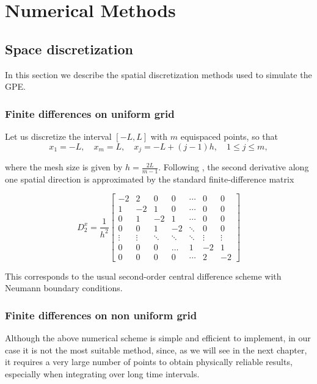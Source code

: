 \chapter{Numerical Methods}

\section{Space discretization}

In this section we describe the spatial discretization methods used to simulate the GPE.

\subsection{Finite differences on uniform grid}

Let us discretize the interval $[-L, L]$ with $m$ equispaced points, so that 
\[
    x_1 = -L, \quad x_m = L, \quad x_j = -L + (j-1)h, \quad 1 \leq j \leq m,
\]

where the mesh size is given by $h = \tfrac{2L}{m-1}$.  
Following \cite{dispenseCaliari}, the second derivative along one spatial direction is approximated by the standard finite-difference matrix

\[
    D_{2}^x = \frac{1}{h^2}
    \begin{bmatrix}
        -2 & 2  & 0  & 0  & \cdots & 0  & 0 \\
        1 & -2 & 1  & 0  & \cdots & 0  & 0 \\
        0 &  1 & -2 & 1  & \cdots & 0  & 0 \\
        0 &  0 &  1 & -2 & \ddots & 0  & 0 \\
        \vdots & \vdots & \ddots & \ddots & \ddots & \vdots & \vdots \\
        0 &  0 &  0 &  \dots & 1 & -2 & 1 \\
        0 &  0 &  0 &  0 & \cdots &  2 & -2
    \end{bmatrix}
\]

This corresponds to the usual second-order central difference scheme with Neumann boundary conditions. 

\subsection{Finite differences on non uniform grid}
\label{sb:nufg}

Although the above numerical scheme is simple and efficient to implement, in our case it is not the most suitable method, since, as we will see in the next chapter, it requires a very large number of points to obtain physically reliable results, especially when integrating over long time intervals.  

